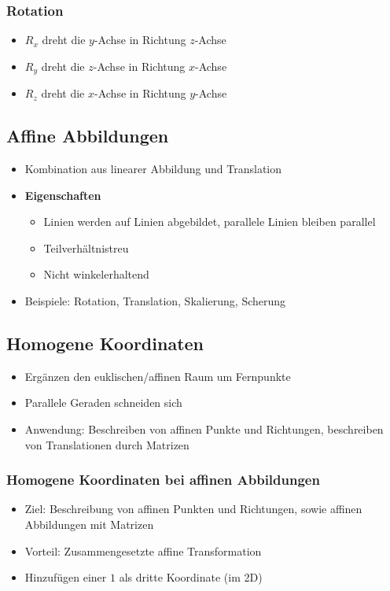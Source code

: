 \subsubsection{Rotation}
\begin{itemize}
	\item \(R_x\) dreht die \(y\)-Achse in Richtung \(z\)-Achse
	\item \(R_y\) dreht die \(z\)-Achse in Richtung \(x\)-Achse
	\item \(R_z\) dreht die \(x\)-Achse in Richtung \(y\)-Achse
\end{itemize}


\subsection{Affine Abbildungen}
\begin{itemize}
	\item Kombination aus linearer Abbildung und Translation
	\item \textbf{Eigenschaften}
	\begin{itemize}
		\item Linien werden auf Linien abgebildet, parallele Linien bleiben parallel
		\item Teilverhältnistreu
		\item Nicht winkelerhaltend
	\end{itemize}
	\item Beispiele: Rotation, Translation, Skalierung, Scherung
\end{itemize}


\subsection{Homogene Koordinaten}
\begin{itemize}
	\item Ergänzen den euklischen/affinen Raum um Fernpunkte
	\item Parallele Geraden schneiden sich
	\item Anwendung: Beschreiben von affinen Punkte und Richtungen, beschreiben von Translationen durch Matrizen
\end{itemize}

\subsubsection{Homogene Koordinaten bei affinen Abbildungen}
\begin{itemize}
	\item Ziel: Beschreibung von affinen Punkten und Richtungen, sowie affinen Abbildungen mit Matrizen
	\item Vorteil: Zusammengesetzte affine Transformation
	\item Hinzufügen einer \(1\) als dritte Koordinate (im 2D)
\end{itemize}


